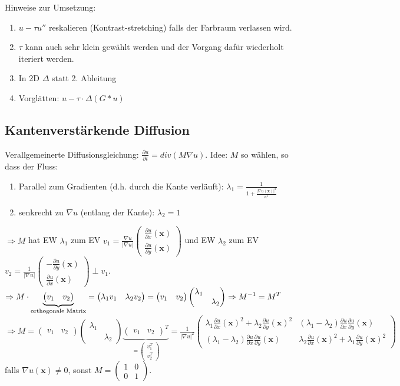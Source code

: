 \documentclass{article}
\theoremstyle{plain}
\theoremstyle{definition}
\numberwithin{equation}{section}
\newcommand{\abs}[1] {
\left| #1 \right|
}
\newcommand{\srmatrix}[1] {
\left( \begin{smallmatrix} #1 \end{smallmatrix} \right)
}
\newcommand{\C}[0]{
    \cdot
}
\newcommand{\x}[0] {
  \boldsymbol{x}
}
\newcommand{\mat}[1] {
\begin{pmatrix} #1 \end{pmatrix}
}
\begin{document}
            Hinweise zur Umsetzung:
            \begin{enumerate}[label=-]
                \item $u - \tau u''$ reskalieren (Kontrast-stretching) falls der Farbraum verlassen wird.
                \item $\tau$ kann auch sehr klein gewählt werden und der Vorgang dafür wiederholt iteriert werden.
                \item In 2D $\Delta$ statt 2. Ableitung
                \item Vorglätten: $u - \tau \C \Delta (G*u)$
            \end{enumerate}

            \subsection{Kantenverstärkende Diffusion}
                Verallgemeinerte Diffusionsgleichung: $\displaystyle \frac{\partial u}{\partial t} = div(M \nabla u)$.
                Idee: $M$ so wählen, so dass der Fluss:
                \begin{enumerate}[label=-]
                    \item Parallel zum Gradienten (d.h. durch die Kante verläuft): $\displaystyle \lambda_1=\frac{1}{1+\frac{\abs{\nabla u (\x)}^2}{\kappa^2}}$
                    \item senkrecht zu $\nabla u$ (entlang der Kante): $\lambda_2=1$
                \end{enumerate}

                $\Rightarrow M$ hat EW $\lambda_1$ zum EV $\displaystyle v_1= \frac{\nabla u}{\abs{\nabla u}}\srmatrix{\frac{\partial u}{\partial x}(\x)\\\frac{\partial u}{\partial y}(\x)}$ und EW $\lambda_2$ zum EV $\displaystyle v_2 = \frac{1}{\abs{\nabla u}} \srmatrix{-\frac{\partial u}{\partial y}(\x)\\\frac{\partial u}{\partial x}(\x)} \perp v_1$.\\
                $\displaystyle \Rightarrow M \C \underbrace{\mat{v_1 & v_2}}_{\small \text{orthogonale Matrix}} = \mat{\lambda_1 v_1 & \lambda_2 v_2} = \mat{v_1 & v_2} \mat{\lambda_1 & \ \\ \ & \lambda_2} \Rightarrow M^{-1} = M^T$\\
                $\Rightarrow M= \mat{v_1 & v_2} \mat{\lambda_1 & \ \\ \ & \lambda_2} \underbrace{\mat{v_1 & v_2}^T}_{=\mat{v_1^T \\ v_2^T}} = \frac{1}{\abs{\nabla u}^2} \mat{\lambda_1 \frac{\partial u}{\partial x}(\x)^2 + \lambda_2 \frac{\partial u}{\partial y}(\x)^2  & (\lambda_1 - \lambda_2)\frac{\partial u}{\partial x} \frac{\partial u}{\partial y}(\x)\\ (\lambda_1 - \lambda_2)\frac{\partial u}{\partial x} \frac{\partial u}{\partial y}(\x) & \lambda_2 \frac{\partial u}{\partial x}(\x)^2 + \lambda_1 \frac{\partial u}{\partial y}(\x)^2}$\\
                falls $\nabla u(\x) \neq 0$, sonst $M= \mat{1 & 0 \\ 0 & 1}$.
\end{document}
